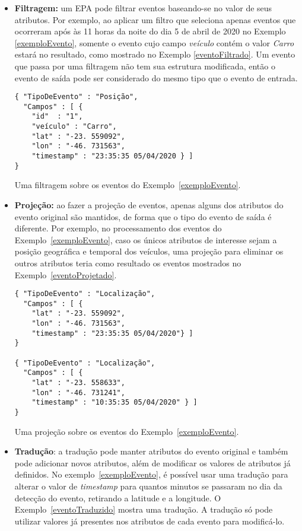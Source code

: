 \begin{itemize}
\item \textbf{Filtragem:} um EPA pode filtrar eventos baseando-se no valor de seus atributos. 
Por exemplo, ao aplicar um filtro que seleciona apenas eventos que ocorreram após às 11 horas da noite do dia 5 de abril de 2020 no Exemplo \ref{exemploEvento}, somente o evento cujo campo \textit{veículo} contém o valor \textit{Carro} estará no resultado, como mostrado no Exemplo \ref{eventoFiltrado}. Um evento que passa por uma filtragem não tem sua estrutura modificada, então o evento de saída pode ser considerado do mesmo tipo que o evento de entrada. 
\begin{evento}[h]
\begin{verbatim}
{ "TipoDeEvento" : "Posição",
  "Campos" : [ {
    "id"  : "1",
    "veículo" : "Carro",
    "lat" : "-23. 559092",
    "lon" : "-46. 731563",
    "timestamp" : "23:35:35 05/04/2020 } ]
}
\end{verbatim}
\caption{Uma filtragem sobre os eventos do Exemplo~\ref{exemploEvento}.}
\label{eventoFiltrado}
\end{evento}


\item \textbf{Projeção:} ao fazer a projeção de eventos, apenas alguns dos atributos do evento original são mantidos, de forma que o tipo do evento de saída é diferente. Por exemplo, no processamento dos eventos do Exemplo~\ref{exemploEvento}, caso os únicos atributos de interesse sejam a posição geográfica e temporal dos veículos, uma projeção para eliminar os outros atributos teria como resultado os eventos mostrados no Exemplo~\ref{eventoProjetado}. 
\begin{evento}[h]
\begin{verbatim}
{ "TipoDeEvento" : "Localização",
  "Campos" : [ {
    "lat" : "-23. 559092",
    "lon" : "-46. 731563",
    "timestamp" : "23:35:35 05/04/2020"} ]
}

{ "TipoDeEvento" : "Localização",
  "Campos" : [ {
    "lat" : "-23. 558633",
    "lon" : "-46. 731241",
    "timestamp" : "10:35:35 05/04/2020" } ]
}
\end{verbatim}
\caption{Uma projeção sobre os eventos do Exemplo~\ref{exemploEvento}.}
\label{eventoProjetado}
\end{evento}


\item \textbf{Tradução}: a tradução pode manter atributos do evento original e também pode adicionar novos atributos, além de modificar os valores de atributos já definidos. No exemplo~\ref{exemploEvento}, é possível usar uma tradução para alterar o valor de \textit{timestamp} para quantos minutos se passaram no dia da detecção do evento, retirando a latitude e a longitude.
O Exemplo~\ref{eventoTraduzido} mostra uma tradução. A tradução só pode utilizar valores já presentes nos atributos de cada evento para modificá-lo.


\end{itemize}
